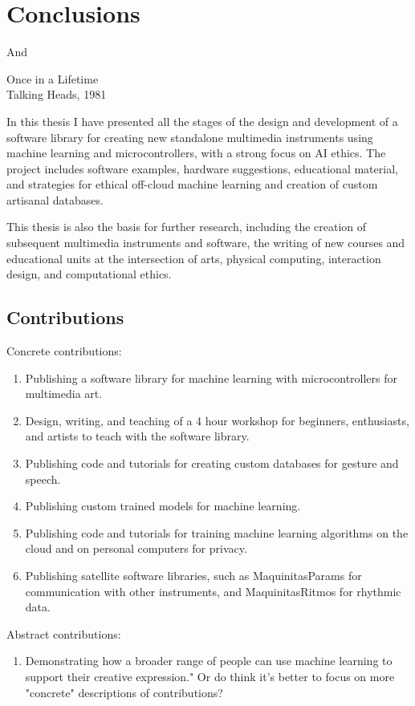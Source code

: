 \chapter{Conclusions}

\epigraph{And}{Once in a Lifetime \\ Talking Heads, 1981}

In this thesis I have presented all the stages of the design and development of a software library for creating new standalone multimedia instruments using machine learning and microcontrollers, with a strong focus on AI ethics. The project includes software examples, hardware suggestions, educational material, and strategies for ethical off-cloud machine learning and creation of custom artisanal databases.

This thesis is also the basis for further research, including the creation of subsequent multimedia instruments and software, the writing of new courses and educational units at the intersection of arts, physical computing, interaction design, and computational ethics.

\section{Contributions}

Concrete contributions:

\begin{enumerate}
  \item Publishing a software library for machine learning with microcontrollers for multimedia art.
  \item Design, writing, and teaching of a 4 hour workshop for beginners, enthusiasts, and artists to teach with the software library.
  \item Publishing code and tutorials for creating custom databases for gesture and speech.
  \item Publishing custom trained models for machine learning.
  \item Publishing code and tutorials for training machine learning algorithms on the cloud and on personal computers for privacy.
  \item Publishing satellite software libraries, such as MaquinitasParams for communication with other instruments, and MaquinitasRitmos for rhythmic data.
\end{enumerate}

Abstract contributions:

\begin{enumerate}
 \item Demonstrating how a broader range of people can use machine learning to support their creative expression." Or do think it's better to focus on more "concrete" descriptions of contributions?
\end{enumerate}

